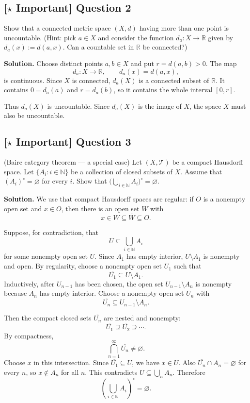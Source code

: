\documentclass{article}
\newcommand{\R}{\mathbb{R}}
\newcommand{\N}{\mathbb{N}}
\newcommand{\important}{\texorpdfstring{\textbf{[\(\star\) Important]}}{[Important]}}
\newenvironment{solution}{\par\noindent\textbf{Solution.}\quad}{\par}
\begin{document}
\subsection{\important{} Question 2}
Show that a connected metric space $(X, d)$ having more than one point is uncountable. (Hint: pick $a \in X$ and consider the function $d_a : X \to \R$ given by $d_a(x) := d(a, x)$. Can a countable set in $\R$ be connected?)

\begin{solution}
Choose distinct points $a,b\in X$ and put $r=d(a,b)>0$. The map
\[
  d_a:X\to\R,\qquad d_a(x)=d(a,x),
\]
is continuous. Since $X$ is connected, $d_a(X)$ is a connected subset of
$\R$. It contains $0=d_a(a)$ and $r=d_a(b)$, so it contains the whole
interval $[0,r]$.

Thus $d_a(X)$ is uncountable. Since $d_a(X)$ is the image of $X$, the
space $X$ must also be uncountable.
\end{solution}

\subsection{\important{} Question 3}
(Baire category theorem --- a special case) Let $(X, \mathcal{T})$ be a compact Hausdorff space. Let $\{A_i : i \in \N\}$ be a collection of closed subsets of $X$. Assume that $(A_i)^\circ = \varnothing$ for every $i$. Show that $\bigl(\bigcup_{i \in \N} A_i\bigr)^\circ = \varnothing$.

\begin{solution}
We use that compact Hausdorff spaces are regular: if $O$ is a nonempty
open set and $x\in O$, then there is an open set $W$ with
\[
  x\in W\subseteq\overline W\subseteq O.
\]

Suppose, for contradiction, that
\[
  U\subseteq \bigcup_{i\in\N}A_i
\]
for some nonempty open set $U$. Since $A_1$ has empty interior,
$U\setminus A_1$ is nonempty and open. By regularity, choose a nonempty
open set $U_1$ such that
\[
  \overline{U_1}\subseteq U\setminus A_1.
\]
Inductively, after $U_{n-1}$ has been chosen, the open set
$U_{n-1}\setminus A_n$ is nonempty because $A_n$ has empty interior.
Choose a nonempty open set $U_n$ with
\[
  \overline{U_n}\subseteq U_{n-1}\setminus A_n.
\]

Then the compact closed sets $\overline{U_n}$ are nested and nonempty:
\[
  \overline{U_1}\supseteq \overline{U_2}\supseteq\cdots.
\]
By compactness,
\[
  \bigcap_{n=1}^{\infty}\overline{U_n}\ne\varnothing.
\]
Choose $x$ in this intersection. Since $\overline{U_1}\subseteq U$, we
have $x\in U$. Also $\overline{U_n}\cap A_n=\varnothing$ for every $n$, so
$x\notin A_n$ for all $n$. This contradicts
$U\subseteq\bigcup_n A_n$. Therefore
\[
  \left(\bigcup_{i\in\N}A_i\right)^\circ=\varnothing.
\]
\end{solution}
\end{document}
